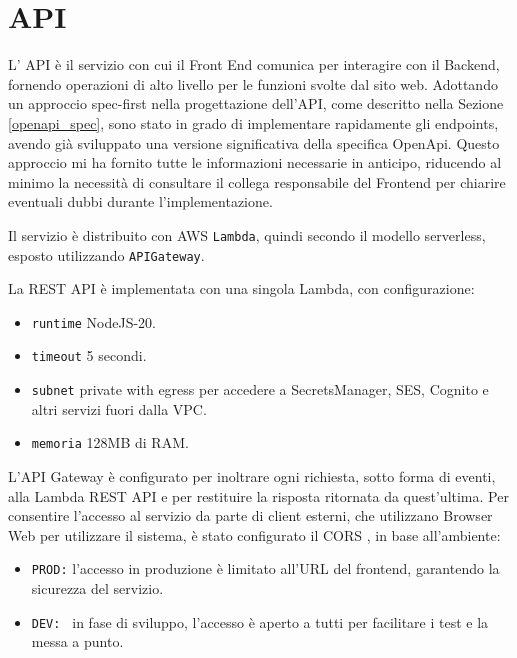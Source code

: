 \section{API}

L’ API è il servizio con cui il Front End comunica per interagire con il Backend, fornendo operazioni di alto livello per le funzioni svolte dal sito web. Adottando un approccio spec-first nella progettazione dell'API, come descritto nella Sezione \ref{openapi_spec}, sono stato in grado di implementare rapidamente gli endpoints, avendo già sviluppato una versione significativa della specifica OpenApi. Questo approccio mi ha fornito tutte le informazioni necessarie in anticipo, riducendo al minimo la necessità di consultare il collega responsabile del Frontend per chiarire eventuali dubbi durante l'implementazione.

Il servizio è distribuito con AWS \texttt{Lambda}, quindi secondo il modello serverless, esposto utilizzando \texttt{APIGateway}.

\vspace{0,3cm}

La REST API è implementata con una singola Lambda, con configurazione: 
\begin{itemize}
    \item \texttt{runtime} NodeJS-20.
    \item \texttt{timeout} 5 secondi.
    \item \texttt{subnet} private with egress per accedere a SecretsManager, SES, Cognito e altri servizi fuori dalla VPC.
    \item \texttt{memoria} 128MB di RAM.
\end{itemize}

L'API Gateway è configurato per inoltrare ogni richiesta, sotto forma di eventi, alla Lambda REST API e per restituire la risposta ritornata da quest'ultima. 
Per consentire l'accesso al servizio da parte di client esterni, che utilizzano Browser Web per utilizzare il sistema, è stato configurato il CORS \cite{rfc6454}, in base all'ambiente:
\begin{itemize}
    \item \texttt{PROD:} l'accesso in produzione è limitato all'URL del frontend, garantendo la sicurezza del servizio.
    \item \texttt{DEV: } in fase di sviluppo, l'accesso è aperto a tutti per facilitare i test e la messa a punto.
\end{itemize}

\vspace{0,3cm}

